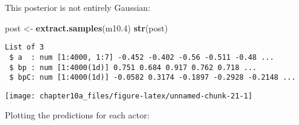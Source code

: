 \documentclass[]{tufte-handout}
\newenvironment{Shaded}{}{}
\newcommand{\KeywordTok}[1]{\textcolor[rgb]{0.00,0.44,0.13}{\textbf{#1}}}
\newcommand{\DecValTok}[1]{\textcolor[rgb]{0.25,0.63,0.44}{#1}}
\newcommand{\FloatTok}[1]{\textcolor[rgb]{0.25,0.63,0.44}{#1}}
\newcommand{\StringTok}[1]{\textcolor[rgb]{0.25,0.44,0.63}{#1}}
\newcommand{\OperatorTok}[1]{\textcolor[rgb]{0.40,0.40,0.40}{#1}}
\newcommand{\NormalTok}[1]{#1}
\begin{document}
This posterior is not entirely Gaussian:

\begin{Shaded}
\begin{Highlighting}[]
\NormalTok{post <-}\StringTok{ }\KeywordTok{extract.samples}\NormalTok{(m10}\FloatTok{.4}\NormalTok{)}
\KeywordTok{str}\NormalTok{(post)}
\end{Highlighting}
\end{Shaded}

\begin{verbatim}
List of 3
 $ a  : num [1:4000, 1:7] -0.452 -0.402 -0.56 -0.511 -0.48 ...
 $ bp : num [1:4000(1d)] 0.751 0.684 0.917 0.762 0.718 ...
 $ bpC: num [1:4000(1d)] -0.0582 0.3174 -0.1897 -0.2928 -0.2148 ...
\end{verbatim}

\begin{Shaded}
\end{Shaded}

\texttt{[image: chapter10a\_files/figure-latex/unnamed-chunk-21-1]}

Plotting the predictions for each actor:
\end{document}
